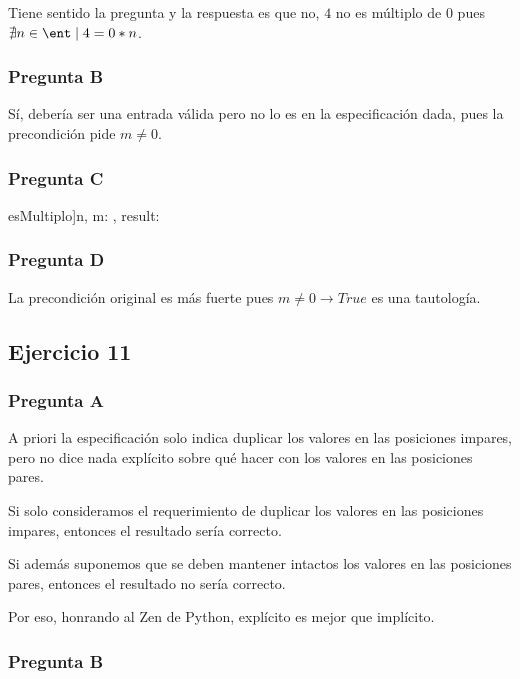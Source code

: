Tiene sentido la pregunta y la respuesta es que no, $4$ no es múltiplo de $0$ pues $\nexists n \in \ent \mid 4 = 0 * n$.

\subsubsection{Pregunta B}

Sí, debería ser una entrada válida pero no lo es en la especificación dada, pues la precondición pide $m \neq 0$.

\subsubsection{Pregunta C}

\begin{proc}{esMultiplo]}{\In n, m: \ent, \Out result: \bool}{}
\end{proc}

\subsubsection{Pregunta D}

La precondición original es más fuerte pues $m \neq 0 \rightarrow True$ es una tautología.

\subsection{Ejercicio 11}

\subsubsection{Pregunta A}

A priori la especificación solo indica duplicar los valores en las posiciones impares, pero no dice nada explícito sobre qué hacer con los valores en las posiciones pares.

Si solo consideramos el requerimiento de duplicar los valores en las posiciones impares, entonces el resultado sería correcto.

Si además suponemos que se deben mantener intactos los valores en las posiciones pares, entonces el resultado no sería correcto.

Por eso, honrando al Zen de Python, explícito es mejor que implícito.

\subsubsection{Pregunta B}

